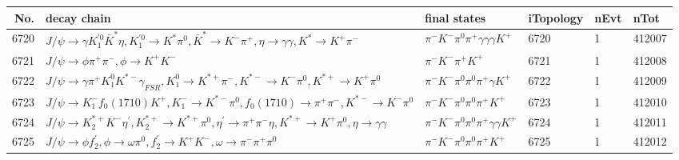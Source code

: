 \begin{table}[htbp] 
\begin{center}
\begin{small}
\begin{tabular}{rlllll}\hline\hline
 No. & decay chain & final states &  iTopology & nEvt & nTot \\\hline
6720&$J/\psi       \rightarrow \gamma       K_1^{'0}      \bar{K}^{*}   \eta          , K_1^{'0}       \rightarrow K^{*}          \pi^{0}        , \bar{K}^{*}    \rightarrow K^{-}          \pi^{+}        , \eta           \rightarrow \gamma       \gamma       , K^{*}           \rightarrow K^{+}          \pi^{-}        $&$\pi^{-}        K^{-}          \pi^{0}        \pi^{+}        \gamma       \gamma       \gamma       K^{+}          $& 6720&    1&412007\\
6721&$J/\psi       \rightarrow \phi           \pi^{+}        \pi^{-}        , \phi            \rightarrow K^{+}          K^{-}          $&$\pi^{-}        K^{-}          \pi^{+}        K^{+}          $& 6721&    1&412008\\
6722&$J/\psi       \rightarrow \gamma       \pi^{+}        K_1^{0}        K^{*-}         \gamma_{FSR} , K_1^{0}         \rightarrow K^{*+}         \pi^{-}        , K^{*-}          \rightarrow K^{-}          \pi^{0}        , K^{*+}          \rightarrow K^{+}          \pi^{0}        $&$\pi^{-}        K^{-}          \pi^{0}        \pi^{0}        \pi^{+}        \gamma       K^{+}          $& 6722&    1&412009\\
6723&$J/\psi       \rightarrow K_{1}^{-}      f_{0}(1710)    K^{+}          , K_{1}^{-}       \rightarrow K^{*-}         \pi^{0}        , f_{0}(1710)     \rightarrow \pi^{+}        \pi^{-}        , K^{*-}          \rightarrow K^{-}          \pi^{0}        $&$\pi^{-}        K^{-}          \pi^{0}        \pi^{0}        \pi^{+}        K^{+}          $& 6723&    1&412010\\
6724&$J/\psi       \rightarrow K_2^{*+}       K^{-}          \eta^{\prime} , K_2^{*+}        \rightarrow K^{*+}         \pi^{0}        , \eta^{\prime}  \rightarrow \pi^{+}        \pi^{-}        \eta          , K^{*+}          \rightarrow K^{+}          \pi^{0}        , \eta           \rightarrow \gamma       \gamma       $&$\pi^{-}        K^{-}          \pi^{0}        \pi^{0}        \pi^{+}        \gamma       \gamma       K^{+}          $& 6724&    1&412011\\
6725&$J/\psi       \rightarrow \phi           f_2^{'}       , \phi            \rightarrow \omega         \pi^{0}        , f_2^{'}        \rightarrow K^{+}          K^{-}          , \omega          \rightarrow \pi^{-}        \pi^{+}        \pi^{0}        $&$\pi^{-}        K^{-}          \pi^{0}        \pi^{0}        \pi^{+}        K^{+}          $& 6725&    1&412012\\

\end{tabular}
\end{small}
\end{center}
\end{table}

